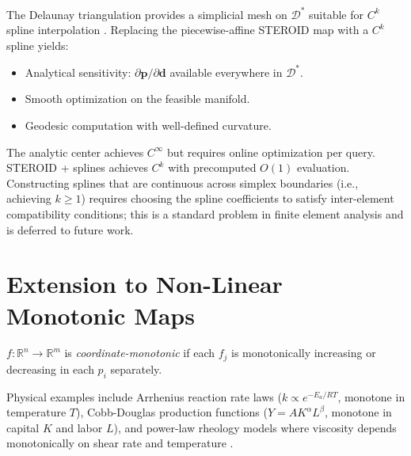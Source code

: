 \documentclass[review,onefignum,onetabnum]{./SIAM_template/siamart171218}
\begin{document}
The Delaunay triangulation provides a simplicial mesh on $\mathcal{D}^*$ suitable for
$C^k$ spline interpolation \cite{LaiSchumaker2007}.  Replacing the piecewise-affine
STEROID map with a $C^k$ spline yields:
\begin{itemize}
	\item Analytical sensitivity: $\partial\mathbf{p}/\partial\mathbf{d}$ available
	      everywhere in $\mathcal{D}^*$.
	\item Smooth optimization on the feasible manifold.
	\item Geodesic computation with well-defined curvature.
\end{itemize}
The analytic center \cite{Nesterov1998} achieves $C^\infty$ but requires online
optimization per query.  STEROID + splines achieves $C^k$ with precomputed $O(1)$ evaluation.
Constructing splines that are continuous across simplex boundaries (i.e.,
achieving $k \geq 1$) requires choosing the spline coefficients to satisfy
inter-element compatibility conditions; this is a standard problem in finite
element analysis \cite{LaiSchumaker2007, Ciarlet2002} and is deferred to
future work.

\section{Extension to Non-Linear Monotonic Maps}
\label{sec:nonlinear}

\begin{definition}
	$f: \mathbb{R}^n \to \mathbb{R}^m$ is \emph{coordinate-monotonic} if each $f_j$
	is monotonically increasing or decreasing in each $p_i$ separately.
\end{definition}

Physical examples include Arrhenius reaction rate laws
($k \propto e^{-E_a/RT}$, monotone in temperature $T$), Cobb-Douglas production
functions ($Y = A K^\alpha L^\beta$, monotone in capital $K$ and labor $L$), and
power-law rheology models where viscosity depends monotonically on shear rate
and temperature \cite{SalazarMeza2023, RomeroObon2025}.
\end{document}

